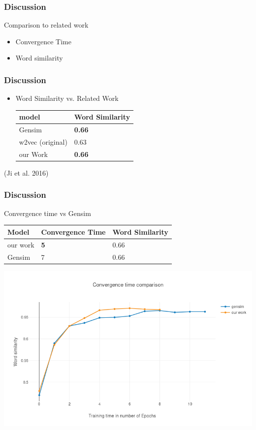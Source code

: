\begin{frame}
\frametitle{Discussion}
Comparison to related work
\begin{itemize}
\item Convergence Time
\item Word similarity
\end{itemize}
\end{frame}
\begin{frame}
\frametitle{Discussion}
\begin{itemize}

\item Word Similarity vs. Related Work
\begin{table}[]
\begin{tabular}{|l|l|}
\hline
model         & Word Similarity \\ \hline
Gensim           & \textbf{ 0.66   }        \\ \hline
w2vec (original) & 0.63           \\ \hline
our Work         & \textbf{0.66}       \\ \hline
\end{tabular}
\end{table}
\end{itemize}
\hfill (Ji et al. 2016) \cite{intel}
\end{frame}

\begin{frame}
\frametitle{Discussion}
Convergence time vs Gensim 
    \begin{table}[]
\begin{tabular}{|l|l|l|}
\hline
Model    & Convergence Time & Word Similarity \\ \hline
our work & \textbf{5}              & 0.66            \\ \hline
Gensim   & 7           & 0.66            \\ \hline
\end{tabular}
\end{table}
\includegraphics[scale=0.3]{images/gensim_vs_adam}
  \end{frame}